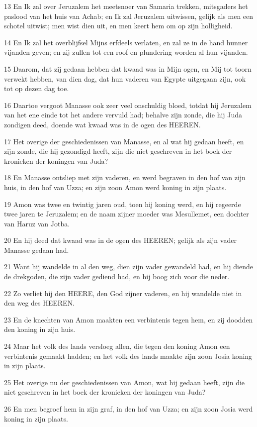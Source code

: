 \par 13 En Ik zal over Jeruzalem het meetsnoer van Samaria trekken, mitsgaders het paslood van het huis van Achab; en Ik zal Jeruzalem uitwissen, gelijk als men een schotel uitwist; men wist dien uit, en men keert hem om op zijn holligheid.
\par 14 En Ik zal het overblijfsel Mijns erfdeels verlaten, en zal ze in de hand hunner vijanden geven; en zij zullen tot een roof en plundering worden al hun vijanden.
\par 15 Daarom, dat zij gedaan hebben dat kwaad was in Mijn ogen, en Mij tot toorn verwekt hebben, van dien dag, dat hun vaderen van Egypte uitgegaan zijn, ook tot op dezen dag toe.
\par 16 Daartoe vergoot Manasse ook zeer veel onschuldig bloed, totdat hij Jeruzalem van het ene einde tot het andere vervuld had; behalve zijn zonde, die hij Juda zondigen deed, doende wat kwaad was in de ogen des HEEREN.
\par 17 Het overige der geschiedenissen van Manasse, en al wat hij gedaan heeft, en zijn zonde, die hij gezondigd heeft, zijn die niet geschreven in het boek der kronieken der koningen van Juda?
\par 18 En Manasse ontsliep met zijn vaderen, en werd begraven in den hof van zijn huis, in den hof van Uzza; en zijn zoon Amon werd koning in zijn plaats.
\par 19 Amon was twee en twintig jaren oud, toen hij koning werd, en hij regeerde twee jaren te Jeruzalem; en de naam zijner moeder was Mesullemet, een dochter van Haruz van Jotba.
\par 20 En hij deed dat kwaad was in de ogen des HEEREN; gelijk als zijn vader Manasse gedaan had.
\par 21 Want hij wandelde in al den weg, dien zijn vader gewandeld had, en hij diende de drekgoden, die zijn vader gediend had, en hij boog zich voor die neder.
\par 22 Zo verliet hij den HEERE, den God zijner vaderen, en hij wandelde niet in den weg des HEEREN.
\par 23 En de knechten van Amon maakten een verbintenis tegen hem, en zij doodden den koning in zijn huis.
\par 24 Maar het volk des lands versloeg allen, die tegen den koning Amon een verbintenis gemaakt hadden; en het volk des lands maakte zijn zoon Josia koning in zijn plaats.
\par 25 Het overige nu der geschiedenissen van Amon, wat hij gedaan heeft, zijn die niet geschreven in het boek der kronieken der koningen van Juda?
\par 26 En men begroef hem in zijn graf, in den hof van Uzza; en zijn zoon Josia werd koning in zijn plaats.

